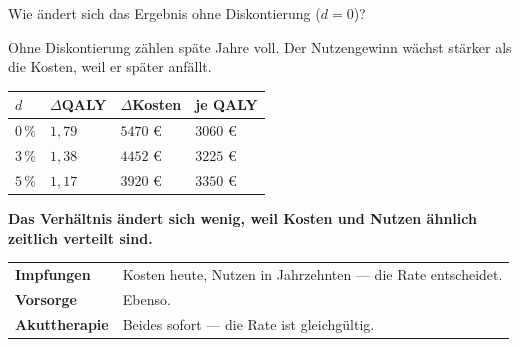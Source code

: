 \begin{aufgabe}
Wie ändert sich das Ergebnis ohne Diskontierung ($d = 0$)?

\loesung
{}
Ohne Diskontierung zählen späte Jahre voll. Der Nutzengewinn wächst stärker als die Kosten, weil er später anfällt.

\begin{center}
{\small
\renewcommand{\arraystretch}{1.48}
\begin{tabular}{@{}P{2.2cm}P{2.0cm}P{2.0cm}P{2.2cm}@{}}
\toprule
$d$ & $\Delta$QALY & $\Delta$Kosten & \textbf{je QALY}\\
\midrule
$0\,\%$ & $1{,}79$ & $5470$ € & $3060$ €\\
$3\,\%$ & $1{,}38$ & $4452$ € & $3225$ €\\
$5\,\%$ & $1{,}17$ & $3920$ € & $3350$ €\\
\bottomrule
\end{tabular}}
\end{center}

\begin{center}
\begin{minipage}{0.9\textwidth}
\textbf{Das Verhältnis ändert sich wenig, weil Kosten und Nutzen ähnlich zeitlich verteilt sind.}
\end{minipage}
\end{center}

\begin{center}
{\small
\renewcommand{\arraystretch}{1.5}
\begin{tabular}{@{}P{2.8cm}P{5.8cm}@{}}
\toprule
\textbf{Impfungen} & Kosten heute, Nutzen in Jahrzehnten --- die Rate entscheidet.\\
\textbf{Vorsorge} & Ebenso.\\
\textbf{Akuttherapie} & Beides sofort --- die Rate ist gleichgültig.\\
\bottomrule
\end{tabular}}
\end{center}

\begin{center}
\begin{minipage}{0.88\textwidth}
\end{minipage}
\end{center}
\end{aufgabe}

